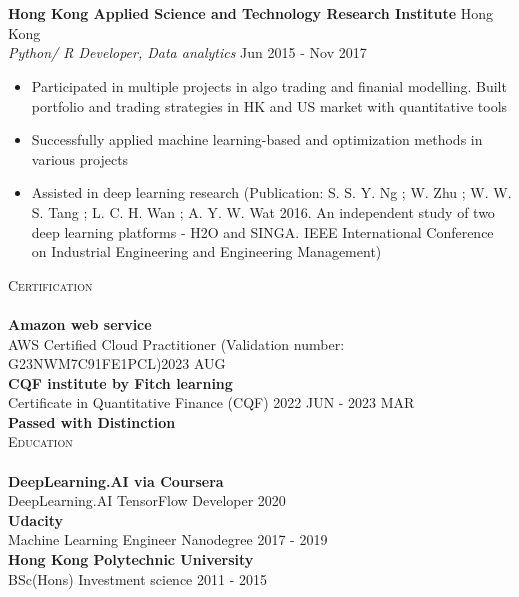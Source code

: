 \documentclass[a4paper]{article}
\newcommand{\lineunder} {
    \vspace*{-8pt} \\
    \hspace*{-18pt} \hrulefill \\
}
\newcommand{\header} [1] {
    {\hspace*{-18pt}\vspace*{6pt} \textsc{#1}}
    \vspace*{-6pt} \lineunder
}
\begin{document}
\lineunder
\textbf{Hong Kong Applied Science and Technology Research Institute} \hfill Hong Kong\\
\textit{Python/ R Developer, Data analytics} \hfill Jun 2015 - Nov 2017\\
\vspace{-1mm}
\begin{itemize} \itemsep 1pt
	\item Participated in multiple projects in algo trading and finanial modelling. Built portfolio and trading strategies in HK and US market with quantitative tools
	\item Successfully applied machine learning-based and optimization methods in various projects
	\item Assisted in deep learning research (Publication: S. S. Y. Ng ; W. Zhu ; W. W. S. Tang ; L. C. H. Wan ; A. Y. W. Wat 2016. An independent study of two deep learning platforms - H2O and SINGA. IEEE International Conference on Industrial Engineering and Engineering Management)
\end{itemize}


\header{Certification}
\textbf{Amazon web service}\\
AWS Certified Cloud Practitioner (Validation number: G23NWM7C91FE1PCL)\hfill 2023 AUG\\
\vspace{2mm}
\textbf{CQF institute by Fitch learning}\\
Certificate in Quantitative Finance (CQF) \hfill 2022 JUN - 2023 MAR\\
\textbf{Passed with Distinction}\\


\header{Education}
\textbf{DeepLearning.AI via Coursera}\\
DeepLearning.AI TensorFlow Developer \hfill 2020\\
\vspace{2mm}
\textbf{Udacity}\\
Machine Learning Engineer Nanodegree \hfill 2017 - 2019\\
\vspace{2mm}
\textbf{Hong Kong Polytechnic University}\\
BSc(Hons) Investment science \hfill 2011 - 2015\\
\vspace{2mm}
\end{document}
